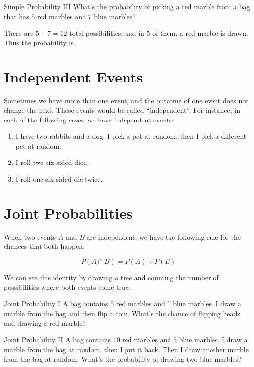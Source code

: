 \documentclass[a4paper,10pt]{report}
\begin{document}
\begin{problem}{Simple Probability III}
 What's the probability of picking a red marble from a bag that has $5$ red
 marbles and $7$ blue marbles?

 \begin{solution}
  There are $5+7=12$ total possibilities, and in $5$ of them, a red marble is
  drawn. Thus the probability is .
 \end{solution}
\end{problem}

\section{Independent Events}

Sometimes we have more than one event, and the outcome of one event does not
change the next. These events would be called ``independent''. For instance,
in each of the following cases, we have independent events:

\begin{enumerate}
 \item I have two rabbits and a dog. I pick a pet at random; then I pick a
 different pet at random.
 \item I roll two six-sided dice.
 \item I roll one six-sided die twice.
\end{enumerate}

\section{Joint Probabilities}

When two events $A$ and $B$ are independent, we have the following rule for the
chances that both happen:

\begin{equation}
 P(A \cap B) = P(A) \times P(B)
\end{equation}

We can see this identity by drawing a tree and counting the number of
possibilities where both events come true.

\begin{problem}{Joint Probability I}
 A bag contains $5$ red marbles and $7$ blue marbles. I draw a marble from the
 bag and then flip a coin. What's the chance of flipping heads and drawing a red
 marble?
\end{problem}

\begin{problem}{Joint Probability II}
 A bag contains $10$ red marbles and $5$ blue marbles. I draw a marble from the
 bag at random, then I put it back. Then I draw another marble from the bag at
 random. What's the probability of drawing two blue marbles?
\end{problem}
\end{document}
